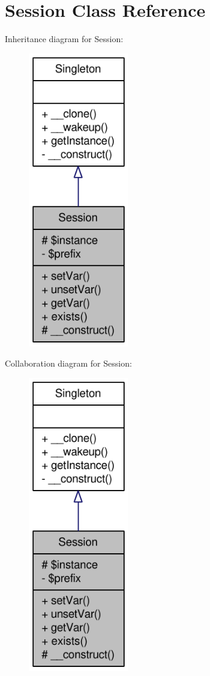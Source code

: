 \hypertarget{classSession}{
\section{Session Class Reference}
\label{classSession}
}


Inheritance diagram for Session:\nopagebreak
\begin{figure}[H]
\begin{center}
\leavevmode
\includegraphics[width=124pt]{classSession__inherit__graph}
\end{center}
\end{figure}


Collaboration diagram for Session:\nopagebreak
\begin{figure}[H]
\begin{center}
\leavevmode
\includegraphics[width=124pt]{classSession__coll__graph}
\end{center}
\end{figure}
